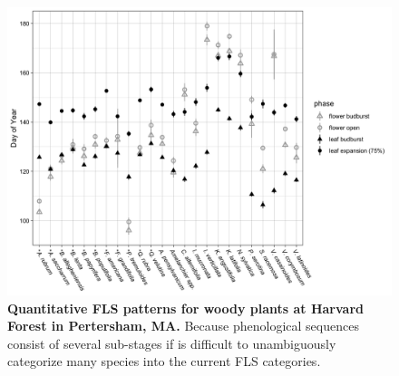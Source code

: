 \documentclass[12pt]{article}\usepackage[]{graphicx}\usepackage[]{color}
\begin{document}
\begin{figure}[H]
    \centering
 \includegraphics[width=\textwidth]{..//HarvardForest/HFmeans_expanded.jpeg} 
    \caption{\textbf{Quantitative FLS patterns for woody plants at Harvard Forest in Pertersham, MA.} Because phenological sequences consist of several sub-stages if is difficult to unambiguously categorize many species into the current FLS categories. }
    \label{fig:HFmeans}
\end{figure}
\end{document}
